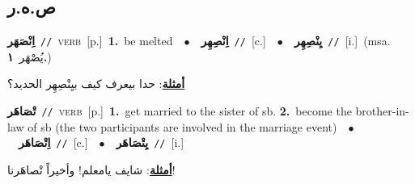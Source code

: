 \documentclass[10pt,a4paper,twoside]{article} %
\begin{document}
\begin{multicols}{2}
\vspace{-3mm}
\subsection*{\color{blue}\foreignlanguage{arabic}{ص.ه.ر}\color{blue}{}} 

{\setlength\topsep{0pt}\textbf{\foreignlanguage{arabic}{اِنْصَهَر}}\ {\color{gray}\texttt{//}\color{black}}\ \textsc{verb}\ [p.]\ \textbf{1.}~be melted\ \ $\bullet$\ \ \setlength\topsep{0pt}\textbf{\foreignlanguage{arabic}{اِنْصِهِر}}\ {\color{gray}\texttt{//}\color{black}}\ [c.]\ \ $\bullet$\ \ \setlength\topsep{0pt}\textbf{\foreignlanguage{arabic}{يِنْصِهِر}}\ {\color{gray}\texttt{//}\color{black}}\ [i.]\ \color{gray}(msa. \foreignlanguage{arabic}{يُصْهَر}~\foreignlanguage{arabic}{\textbf{١.}})\color{black}\  \begin{flushright}\color{gray}\foreignlanguage{arabic}{\textbf{\underline{\foreignlanguage{arabic}{أمثلة}}}: حدا بيعرف كيف بيِنْصِهِر الحديد؟}\end{flushright}\color{black}} \vspace{2mm}

{\setlength\topsep{0pt}\textbf{\foreignlanguage{arabic}{تْصَاهَر}}\ {\color{gray}\texttt{//}\color{black}}\ \textsc{verb}\ [p.]\ \textbf{1.}~get married to the sister of sb.  \textbf{2.}~become the brother-in-law of sb (the two participants are involved in the marriage event)\ \ $\bullet$\ \ \setlength\topsep{0pt}\textbf{\foreignlanguage{arabic}{اِتْصَاهَر}}\ {\color{gray}\texttt{//}\color{black}}\ [c.]\ \ $\bullet$\ \ \setlength\topsep{0pt}\textbf{\foreignlanguage{arabic}{يِتْصَاهَر}}\ {\color{gray}\texttt{//}\color{black}}\ [i.]\  \begin{flushright}\color{gray}\foreignlanguage{arabic}{\textbf{\underline{\foreignlanguage{arabic}{أمثلة}}}: شايف يامعلم! وأخيراً تْصاهَرنا!}\end{flushright}\color{black}} \vspace{2mm}


\end{multicols}
\end{document}
